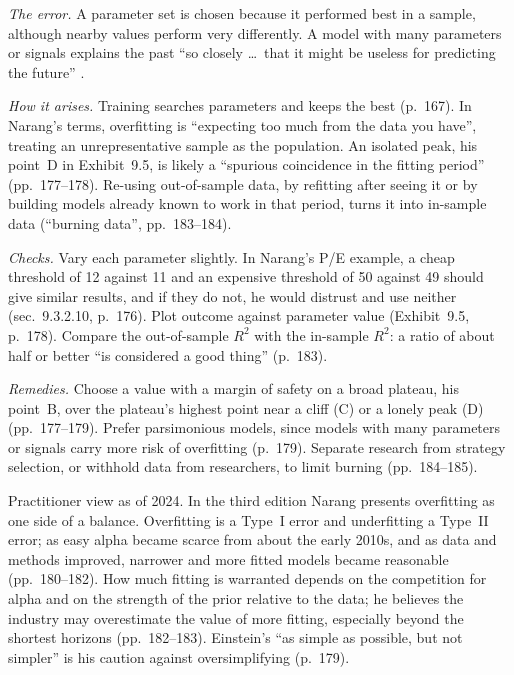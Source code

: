 \begin{qfpitfall}\label{pit:parameter-overfitting}
 \emph{The error.} A parameter set is chosen because it performed best in a sample, although nearby values perform very differently. A model with many parameters or signals explains the past ``so closely \dots\ that it might be useless for predicting the future'' \citep[chap.~``Research'', secs.~9.3.2.10--9.3.3, pp.~176--179]{s7-narang}.

\emph{How it arises.} Training searches parameters and keeps the best (p.~167). In Narang's terms, overfitting is ``expecting too much from the data you have'', treating an unrepresentative sample as the population. An isolated peak, his point~D in Exhibit~9.5, is likely a ``spurious coincidence in the fitting period'' (pp.~177--178). Re-using out-of-sample data, by refitting after seeing it or by building models already known to work in that period, turns it into in-sample data (``burning data'', pp.~183--184).

\emph{Checks.} Vary each parameter slightly. In Narang's P/E example, a cheap threshold of 12 against 11 and an expensive threshold of 50 against 49 should give similar results, and if they do not, he would distrust and use neither (sec.~9.3.2.10, p.~176). Plot outcome against parameter value (Exhibit~9.5, p.~178). Compare the out-of-sample $R^2$ with the in-sample $R^2$: a ratio of about half or better ``is considered a good thing'' (p.~183).

\emph{Remedies.} Choose a value with a margin of safety on a broad plateau, his point~B, over the plateau's highest point near a cliff (C) or a lonely peak (D) (pp.~177--179). Prefer parsimonious models, since models with many parameters or signals carry more risk of overfitting (p.~179). Separate research from strategy selection, or withhold data from researchers, to limit burning (pp.~184--185).

 Practitioner view as of 2024. In the third edition Narang presents overfitting as one side of a balance. Overfitting is a Type~I error and underfitting a Type~II error; as easy alpha became scarce from about the early 2010s, and as data and methods improved, narrower and more fitted models became reasonable (pp.~180--182). How much fitting is warranted depends on the competition for alpha and on the strength of the prior relative to the data; he believes the industry may overestimate the value of more fitting, especially beyond the shortest horizons (pp.~182--183). Einstein's ``as simple as possible, but not simpler'' is his caution against oversimplifying (p.~179).


\end{qfpitfall}
